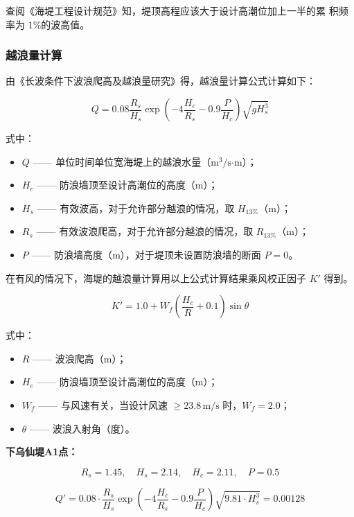 \documentclass[UTF8, a4paper, 12pt]{ctexart} %
\begin{document}
查阅《海堤工程设计规范》知，堤顶高程应该大于设计高潮位加上一半的累
积频率为 $1\%$的波高值。
\subsubsection{越浪量计算}
由《长波条件下波浪爬高及越浪量研究》得，越浪量计算公式计算如下：



\begin{equation}
    Q = 0.08 \frac{R_s}{H_s} \exp\left(-4 \frac{H_c}{R_s} - 0.9 \frac{P}{H_c}\right) \sqrt{g H_s^3}
\end{equation}

式中：
\begin{itemize}
    \item $Q$ —— 单位时间单位宽海堤上的越浪水量（$\text{m}^3/\text{s·m}$）；
    \item $H_c$ —— 防浪墙顶至设计高潮位的高度（$\text{m}$）；
    \item $H_s$ —— 有效波高，对于允许部分越浪的情况，取 $H_{13\%}$（$\text{m}$）；
    \item $R_s$ —— 有效波浪爬高，对于允许部分越浪的情况，取 $R_{13\%}$（$\text{m}$）；
    \item $P$ —— 防浪墙高度（$\text{m}$），对于堤顶未设置防浪墙的断面 $P = 0$。
\end{itemize}

在有风的情况下，海堤的越浪量计算用以上公式计算结果乘风校正因子 $K'$ 得到。

\begin{equation}
    K' = 1.0 + W_f \left( \frac{H_c}{R} + 0.1 \right) \sin \theta
\end{equation}

式中：
\begin{itemize}
    \item $R$ —— 波浪爬高（$\text{m}$）；
    \item $H_c$ —— 防浪墙顶至设计高潮位的高度（$\text{m}$）；
    \item $W_f$ —— 与风速有关，当设计风速 $\geq 23.8\,\text{m/s}$ 时，$W_f = 2.0$；
    \item $\theta$ —— 波浪入射角（度）。
\end{itemize}


\textbf{下乌仙堤A1点：}

\[
R_s = 1.45, \quad H_s = 2.14, \quad H_c = 2.11, \quad P = 0.5
\]

\[
Q' = 0.08 \cdot \frac{R_s}{H_s} \exp\left(-4 \frac{H_c}{R_s} - 0.9 \frac{P}{H_c}\right) \sqrt{9.81 \cdot H_s^3} = 0.00128
\]
\end{document}
